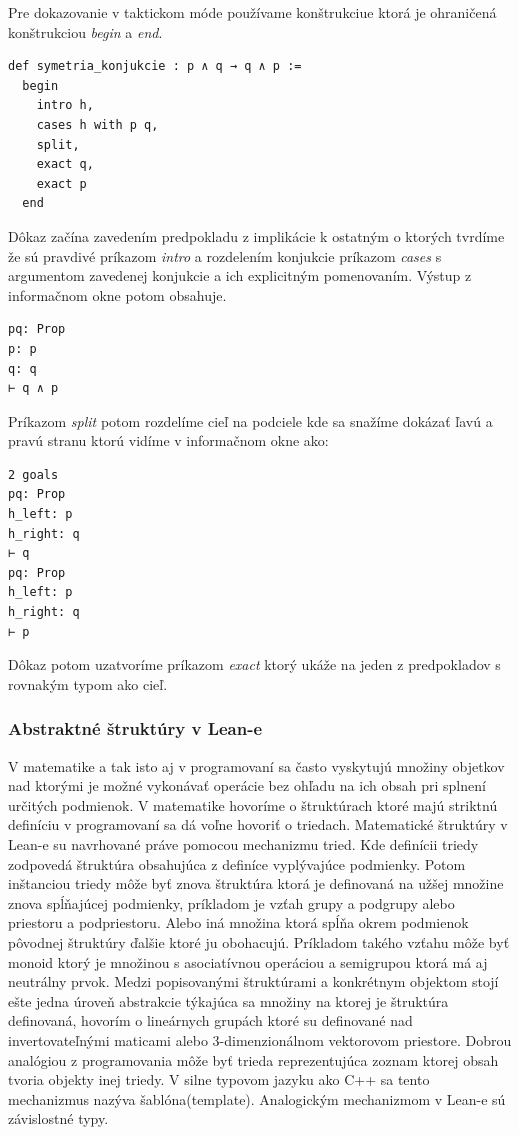 \documentclass[a4paper,10pt,oneside]{report}%
\begin{document}
Pre dokazovanie v taktickom móde používame konštrukciue ktorá je ohraničená
    konštrukciou \emph{begin} a \emph{end}.

\begin{lstlisting}
def symetria_konjukcie : p ∧ q → q ∧ p :=
  begin
    intro h,
    cases h with p q,
    split,
    exact q,
    exact p
  end
\end{lstlisting}

Dôkaz začína zavedením predpokladu z implikácie k ostatným o ktorých tvrdíme že
    sú pravdivé príkazom \emph{intro} a rozdelením konjukcie príkazom \emph{cases}
    s argumentom zavedenej konjukcie a ich explicitným pomenovaním.
Výstup z informačnom okne potom obsahuje.

\begin{lstlisting}
pq: Prop
p: p
q: q
⊢ q ∧ p
\end{lstlisting}

Príkazom \emph{split} potom rozdelíme cieľ na podciele kde sa snažíme dokázať
ľavú a pravú stranu ktorú vidíme v informačnom okne ako:

\begin{lstlisting}
2 goals
pq: Prop
h_left: p
h_right: q
⊢ q
pq: Prop
h_left: p
h_right: q
⊢ p
\end{lstlisting}

Dôkaz potom uzatvoríme príkazom \emph{exact} ktorý ukáže na jeden z predpokladov
    s rovnakým typom ako cieľ.

\subsubsection{Abstraktné štruktúry v Lean-e}
    V matematike a tak isto aj v programovaní sa často vyskytujú množiny objetkov
nad ktorými je možné vykonávať operácie bez ohľadu na ich obsah pri splnení
určitých podmienok.
    V matematike hovoríme o štruktúrach ktoré majú striktnú definíciu v programovaní
sa dá voľne hovoriť o triedach.
    Matematické štruktúry v Lean-e su navrhované práve pomocou mechanizmu tried.
    Kde definícii triedy zodpovedá štruktúra obsahujúca z definíce vyplývajúce podmienky.
    Potom inštanciou triedy môže byť znova štruktúra ktorá je definovaná na užšej množine
znova spĺňajúcej podmienky, príkladom je vzťah grupy a podgrupy alebo
priestoru a podpriestoru.
    Alebo iná množina ktorá spĺňa okrem podmienok pôvodnej štruktúry ďalšie ktoré ju
obohacujú.
    Príkladom takého vzťahu môže byť monoid ktorý je množinou s asociatívnou operáciou
a semigrupou ktorá má aj neutrálny prvok.
    Medzi popisovanými štruktúrami a konkrétnym objektom stojí ešte jedna úroveň
abstrakcie týkajúca sa množiny na ktorej je štruktúra definovaná, hovorím
o lineárnych grupách ktoré su definované nad invertovateľnými maticami alebo 
    3-dimenzionálnom vektorovom priestore.
    Dobrou analógiou z programovania môže byť trieda reprezentujúca zoznam ktorej
obsah tvoria objekty inej triedy.
    V silne typovom jazyku ako C++ sa tento mechanizmus nazýva šablóna(template).
    Analogickým mechanizmom v Lean-e sú závislostné typy.
\end{document}

